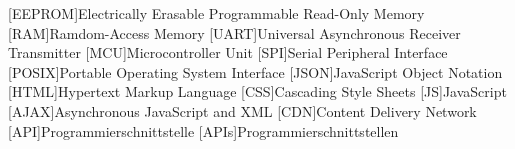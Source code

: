 \begin{acronym}[xxxxxxxxx]
  [EEPROM]{Electrically Erasable Programmable Read-Only Memory}
  [RAM]{Ramdom-Access Memory}
  [UART]{Universal Asynchronous Receiver Transmitter}
  [MCU]{Microcontroller Unit}
  [SPI]{Serial Peripheral Interface}
  [POSIX]{Portable Operating System Interface}
  [JSON]{JavaScript Object Notation}
  [HTML]{Hypertext Markup Language}
  [CSS]{Cascading Style Sheets}
  [JS]{JavaScript}
  [AJAX]{Asynchronous JavaScript and XML}
  [CDN]{Content Delivery Network}
  [API]{Programmierschnittstelle}
  [APIs]{Programmierschnittstellen}
  
\end{acronym}

